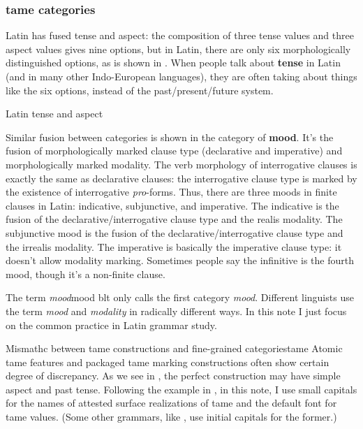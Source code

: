 \documentclass[UTF8, a4paper, oneside]{report}
\newcommand*{\concept}[1]{\textbf{#1}}
\newcommand*{\term}[1]{\emph{#1}}
\begin{document}
\subsubsection{\acs{tame} categories}

Latin has fused tense and aspect:
the composition of three tense values and three aspect values 
gives nine options,
but in Latin, there are only six morphologically distinguished options,
as is shown in . 
When people talk about \concept{tense} in Latin (and in many other Indo-European languages),
they are often taking about things like the six options,
instead of the past/present/future system.

\begin{table}[H]
    \caption{Latin tense and aspect}
    \label{tbl:latin-tense-aspect}
    \centering
        
\end{table}

Similar fusion between categories is shown in the category of \concept{mood}.
It's the fusion of morphologically marked clause type 
(declarative and imperative)
and morphologically marked modality.
The verb morphology of interrogative clauses is exactly the same as declarative clauses:
the interrogative clause type is marked by the existence of interrogative \term{pro}-forms.
Thus, there are three moods in finite clauses in Latin:
\acl{indicative}, \acl{subjunctive}, and \acl{imperative}.
The \acl{indicative} is the fusion of 
the declarative/interrogative clause type and the realis modality.
The \acl{subjunctive} mood is the fusion of 
the declarative/interrogative clause type and the irrealis modality.
The \acl{imperative} is basically the imperative clause type:
it doesn't allow modality marking.
Sometimes people say the infinitive is the fourth mood,
though it's a non-finite clause.

\begin{theorybox}{The term \term{mood}}{mood}
    \acs{blt} only calls the first category \term{mood}.
    Different linguists use the term \term{mood} and \term{modality} in radically different ways.
    In this note I just focus on the common practice in Latin grammar study.
\end{theorybox}

\begin{theorybox}{Mismathc between \ac{tame} constructions and fine-grained categories}{tame}
    Atomic \ac{tame} features and packaged \ac{tame} marking constructions
    often show certain degree of discrepancy.
    As we see in ,
    the \acl{perfect} construction may have simple aspect and past tense.
    Following the example in \citet{grimm2021grammar},
    in this note, I use small capitals for the names of attested surface realizations of \ac{tame}
    and the default font for \ac{tame} values.
    (Some other grammars, like \citet{jacques2021grammar,friesen2017grammar}, 
    use initial capitals for the former.)
\end{theorybox}
\end{document}
